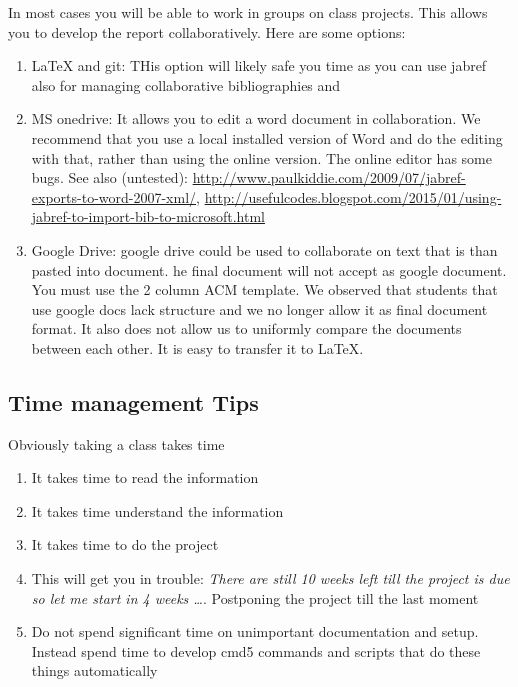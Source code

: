 In most cases you will be able to work in groups on class projects. This
allows you to develop the report collaboratively. Here are some options:

\begin{enumerate}

\item
  LaTeX and git: THis option will likely safe you time as you can use
  jabref also for managing collaborative bibliographies and
\item
  MS onedrive: It allows you to edit a word document in collaboration.
  We recommend that you use a local installed version of Word and do the
  editing with that, rather than using the online version. The online
  editor has some bugs. See also (untested):
  \url{http://www.paulkiddie.com/2009/07/jabref-exports-to-word-2007-xml/},
  \url{http://usefulcodes.blogspot.com/2015/01/using-jabref-to-import-bib-to-microsoft.html}
\item
  Google Drive: google drive could be used to collaborate on text that
  is than pasted into document. he final document will not accept as
  google document. You must use the 2 column ACM template. We observed
  that students that use google docs lack structure and we no longer
  allow it as final document format. It also does not allow us to
  uniformly compare the documents between each other. It is easy to
  transfer it to LaTeX.
\end{enumerate}

\subsection{Time management Tips}\label{timemanagement-tips}

Obviously taking a class takes time

\begin{enumerate}

\item
  It takes time to read the information
\item
  It takes time understand the information
\item
  It takes time to do the project
\item
  This will get you in trouble: \emph{There are still 10 weeks left till
  the project is due so let me start in 4 weeks \ldots{}}. Postponing
  the project till the last moment
\item
  Do not spend significant time on unimportant documentation and setup.
  Instead spend time to develop cmd5 commands and scripts that do these
  things automatically
\end{enumerate}

